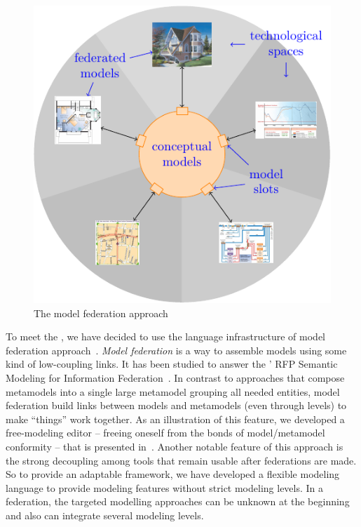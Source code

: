 

\begin{figure}[t]
    \centering
    \includegraphics[width=\columnwidth]{Figures/federation.pdf}
    \caption{The model federation approach}
    \label{fig:mf}
\end{figure}

To meet the \mlpc, we have decided to use the language infrastructure of
model federation approach~\parencite{Golra2016-federation}. \emph{Model
  federation} is a way to assemble models using some kind of
low-coupling links. It has been studied to answer the \OMG' RFP
Semantic Modeling for Information Federation~\parencite{simf}. In
contrast to approaches that compose metamodels into a single large
metamodel grouping all needed entities, model federation build links
between models and metamodels (even through levels) to make ``things''
work together. As an illustration of this feature, we developed a
free-modeling editor -- freeing oneself from the bonds of
model/metamodel conformity -- that is presented
in~\parencite{models2016-freemodel}. Another notable feature of
this approach is the strong decoupling among tools that remain usable
after federations are made.
So to provide an adaptable framework, we have developed a flexible modeling language to provide modeling features without strict modeling levels. In a federation, the targeted modelling approaches can be unknown at the beginning and also can integrate several modeling levels.


